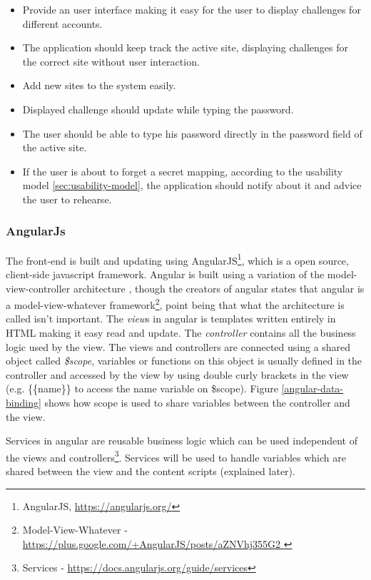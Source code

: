 \begin{itemize}
    \item Provide an user interface making it easy for the user to display challenges for different accounts.
    \item The application should keep track the active site, displaying challenges for the correct site without user interaction.
    \item Add new sites to the system easily. 
    \item Displayed challenge should update while typing the password.
    \item The user should be able to type his password directly in the password field of the active site.
    \item If the user is about to forget a secret mapping, according to the usability model \ref{sec:usability-model}, the application should notify about it and advice the user to rehearse.
\end{itemize}


\subsubsection{AngularJs}
The front-end is built and updating using AngularJS\footnote{AngularJS, \url{https://angularjs.org/}}, which is a open source, client-side javascript framework. Angular is built using a variation of the model-view-controller architecture \cite{mvc}, though the creators of angular states that angular is a model-view-whatever framework\footnote{Model-View-Whatever - \url{ https://plus.google.com/+AngularJS/posts/aZNVhj355G2 }}, point being that what the architecture is called isn't important. The \emph{view}s in angular is templates written entirely in HTML making it easy read and update. The \emph{controller} contains all the business logic used by the view. The views and controllers are connected using a shared object called \emph{\$scope}, variables or functions on this object is usually defined in the controller and accessed by the view by using double curly brackets in the view (e.g. \{\{name\}\} to access the name variable on \$scope). Figure \ref{angular-data-binding} shows how scope is used to share variables between the controller and the view. 
\par Services in angular are reusable business logic which can be used independent of the views and controllers\footnote{Services - \url{https://docs.angularjs.org/guide/services}}. Services will be used to handle variables which are shared between the view and the content scripts (explained later).

